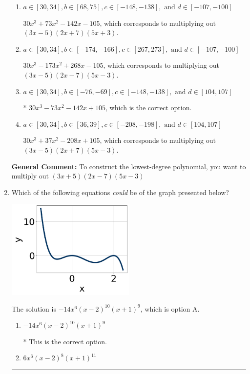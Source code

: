 \documentclass{extbook}[14pt]
\newcommand{\litem}[1]{\item #1

\rule{\textwidth}{0.4pt}}
\begin{document}
\begin{enumerate}
{\begin{enumerate}[label=\Alph*.]
$30x^{3} -73 x^{2} -142 x -105$, which corresponds to multiplying everything correctly except the constant term.
\item \( a \in [30, 34], b \in [68, 75], c \in [-148, -138], \text{ and } d \in [-107, -100] \)

$30x^{3} +73 x^{2} -142 x -105$, which corresponds to multiplying out $(3x -5)(2x + 7)(5x + 3)$.
\item \( a \in [30, 34], b \in [-174, -166], c \in [267, 273], \text{ and } d \in [-107, -100] \)

$30x^{3} -173 x^{2} +268 x -105$, which corresponds to multiplying out $(3x -5)(2x -7)(5x -3)$.
\item \( a \in [30, 34], b \in [-76, -69], c \in [-148, -138], \text{ and } d \in [104, 107] \)

* $30x^{3} -73 x^{2} -142 x + 105$, which is the correct option.
\item \( a \in [30, 34], b \in [36, 39], c \in [-208, -198], \text{ and } d \in [104, 107] \)

$30x^{3} +37 x^{2} -208 x + 105$, which corresponds to multiplying out $(3x -5)(2x + 7)(5x -3)$.
\end{enumerate}

\textbf{General Comment:} To construct the lowest-degree polynomial, you want to multiply out $(3x + 5)(2x -7)(5x -3)$
}
\litem{
Which of the following equations \textit{could} be of the graph presented below?

\begin{center}
    \includegraphics[width=0.5\textwidth]{../Figures/polyGraphToFunctionA.png}
\end{center}




The solution is \( -14x^{6} (x - 2)^{10} (x + 1)^{9} \), which is option A.\begin{enumerate}[label=\Alph*.]
\item \( -14x^{6} (x - 2)^{10} (x + 1)^{9} \)

* This is the correct option.
\item \( 6x^{6} (x - 2)^{8} (x + 1)^{11} \)


\end{enumerate}}
\end{enumerate}
\end{document}
